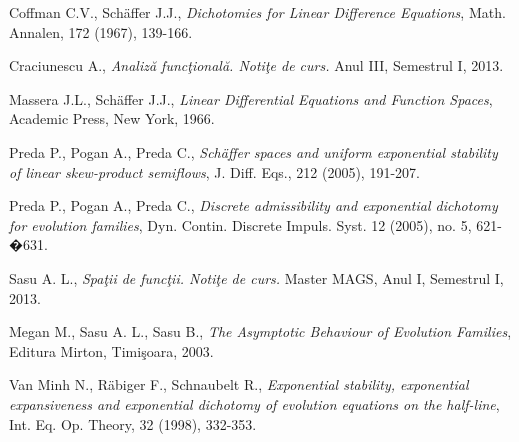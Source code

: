 \documentclass[ a4paper, 12pt]{report}
\theoremstyle{definition}
\theoremstyle{remark}
\numberwithin{equation}{section}
\begin{document}
\begin{thebibliography}{}

Coffman C.V., Sch\"{a}ffer J.J., \emph{Dichotomies for Linear Difference Equations}, Math. Annalen, 172 (1967), 139-166.

Craciunescu A., \emph{Analiz\u a func\c tional\u a. Noti\c te de curs.} Anul III, Semestrul I, 2013.

Massera J.L., Sch\"{a}ffer J.J., \emph{Linear Differential Equations and Function Spaces},
Academic Press, New York, 1966.

Preda P., Pogan A., Preda C., \emph{Sch\"{a}ffer spaces and uniform exponential stability of linear skew-product semiflows},
J. Diff. Eqs., 212 (2005), 191-207.

Preda P., Pogan A., Preda C.,
\emph{Discrete admissibility and exponential dichotomy for evolution families},
Dyn. Contin. Discrete Impuls. Syst.  12 (2005), no. 5, 621-�631.

Sasu A. L., \emph{Spa\c tii de func\c tii. Noti\c te de curs.} Master MAGS, Anul I, Semestrul I, 2013.

Megan M., Sasu A. L., Sasu B., \emph{The Asymptotic Behaviour of Evolution Families}, Editura Mirton, Timi\c soara, 2003.

Van Minh N., R\"{a}biger F., Schnaubelt R.,
\emph{Exponential stability, exponential expansiveness and exponential
dichotomy of evolution equations on the half-line}, Int. Eq. Op. Theory, 32 (1998), 332-353.


\end{thebibliography}{}
\end{document}
